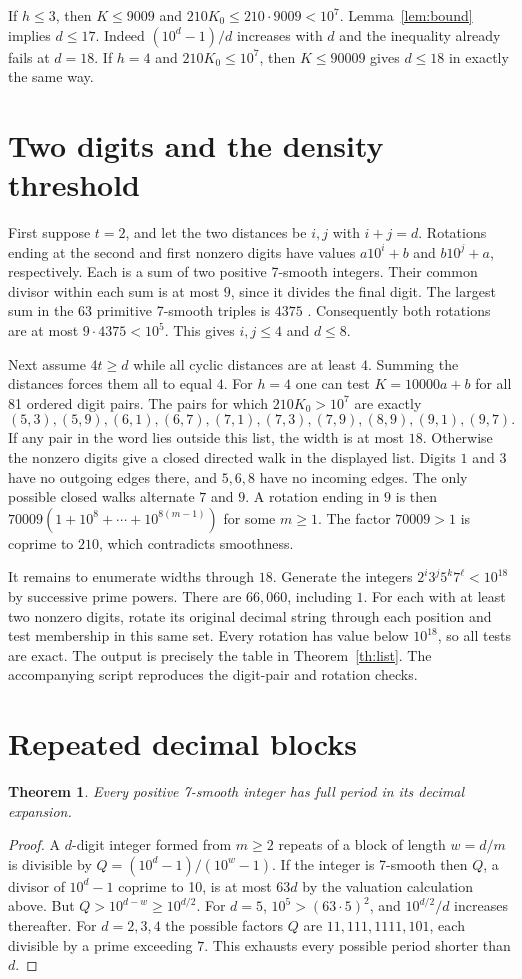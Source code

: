 \documentclass[11pt,letterpaper]{article}
\newtheorem{theorem}{Theorem}
\begin{document}
If $h\le3$, then $K\le9009$ and $210K_0\le210\cdot9009<10^7$. Lemma~\ref{lem:bound} implies $d\le17$. Indeed $(10^d-1)/d$ increases with $d$ and the inequality already fails at $d=18$. If $h=4$ and $210K_0\le10^7$, then $K\le90009$ gives $d\le18$ in exactly the same way.

\section{Two digits and the density threshold}
First suppose $t=2$, and let the two distances be $i,j$ with $i+j=d$. Rotations ending at the second and first nonzero digits have values $a10^i+b$ and $b10^j+a$, respectively. Each is a sum of two positive 7-smooth integers. Their common divisor within each sum is at most $9$, since it divides the final digit. The largest sum in the 63 primitive 7-smooth triples is $4375$ \cite{data}. Consequently both rotations are at most $9\cdot4375<10^5$. This gives $i,j\le4$ and $d\le8$.

Next assume $4t\ge d$ while all cyclic distances are at least $4$. Summing the distances forces them all to equal $4$. For $h=4$ one can test $K=10000a+b$ for all 81 ordered digit pairs. The pairs for which $210K_0>10^7$ are exactly
\[
 (5,3),(5,9),(6,1),(6,7),(7,1),(7,3),(7,9),(8,9),(9,1),(9,7).
\]
If any pair in the word lies outside this list, the width is at most $18$. Otherwise the nonzero digits give a closed directed walk in the displayed list. Digits $1$ and $3$ have no outgoing edges there, and $5,6,8$ have no incoming edges. The only possible closed walks alternate $7$ and $9$. A rotation ending in $9$ is then $70009(1+10^8+\cdots+10^{8(m-1)})$ for some $m\ge1$. The factor $70009>1$ is coprime to $210$, which contradicts smoothness.

It remains to enumerate widths through $18$. Generate the integers $2^i3^j5^k7^\ell<10^{18}$ by successive prime powers. There are $66{,}060$, including $1$. For each with at least two nonzero digits, rotate its original decimal string through each position and test membership in this same set. Every rotation has value below $10^{18}$, so all tests are exact. The output is precisely the table in Theorem~\ref{th:list}. The accompanying script reproduces the digit-pair and rotation checks.

\section{Repeated decimal blocks}
\begin{theorem}
Every positive 7-smooth integer has full period in its decimal expansion.
\end{theorem}
\begin{proof}
A $d$-digit integer formed from $m\ge2$ repeats of a block of length $w=d/m$ is divisible by
$Q=(10^d-1)/(10^w-1)$. If the integer is 7-smooth then $Q$, a divisor of $10^d-1$ coprime to 10, is at most $63d$ by the valuation calculation above. But $Q>10^{d-w}\ge10^{d/2}$. For $d=5$, $10^5>(63\cdot5)^2$, and $10^{d/2}/d$ increases thereafter. For $d=2,3,4$ the possible factors $Q$ are $11,111,1111,101$, each divisible by a prime exceeding $7$. This exhausts every possible period shorter than $d$.
\end{proof}
\end{document}
